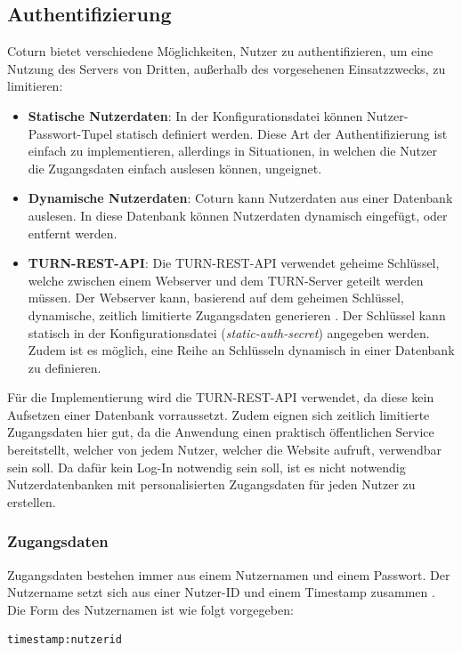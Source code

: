 \subsection{Authentifizierung}
Coturn bietet verschiedene Möglichkeiten, Nutzer zu authentifizieren, um eine Nutzung des Servers von Dritten, außerhalb des vorgesehenen Einsatzzwecks, zu limitieren:

\begin{itemize}
  \item \textbf{Statische Nutzerdaten}: In der Konfigurationsdatei können Nutzer-Passwort-Tupel statisch definiert werden. Diese Art der Authentifizierung ist einfach zu implementieren, allerdings in Situationen, in welchen die Nutzer die Zugangsdaten einfach auslesen können, ungeignet.
  \item \textbf{Dynamische Nutzerdaten}: Coturn kann Nutzerdaten aus einer Datenbank auslesen. In diese Datenbank können Nutzerdaten dynamisch eingefügt, oder entfernt werden.
  \item \textbf{TURN-REST-API}: Die TURN-REST-API verwendet geheime Schlüssel, welche zwischen einem Webserver und dem TURN-Server geteilt werden müssen. Der Webserver kann, basierend auf dem geheimen Schlüssel, dynamische, zeitlich limitierte Zugangsdaten generieren \cite{turnrestRFC}. Der Schlüssel kann statisch in der Konfigurationsdatei (\textit{static-auth-secret}) angegeben werden. Zudem ist es möglich, eine Reihe an Schlüsseln dynamisch in einer Datenbank zu definieren.
\end{itemize}

Für die Implementierung wird die TURN-REST-API verwendet, da diese kein Aufsetzen einer Datenbank vorraussetzt. Zudem eignen sich zeitlich limitierte Zugangsdaten hier gut, da die Anwendung einen praktisch öffentlichen Service bereitstellt, welcher von jedem Nutzer, welcher die Website aufruft, verwendbar sein soll. Da dafür kein Log-In notwendig sein soll, ist es nicht notwendig Nutzerdatenbanken mit personalisierten Zugangsdaten für jeden Nutzer zu erstellen.\par

\newpage
\subsubsection{Zugangsdaten}
Zugangsdaten bestehen immer aus einem Nutzernamen und einem Passwort. Der Nutzername setzt sich aus einer Nutzer-ID und einem Timestamp zusammen \cite{turnrestRFC}. Die Form des Nutzernamen ist wie folgt vorgegeben:
\lstset{style=STYLE_COMMAND_LINE_ARGUMENT_SINGLE_LINE}
\begin{lstlisting}[belowskip=-0.8 \baselineskip]
timestamp:nutzerid
\end{lstlisting}

